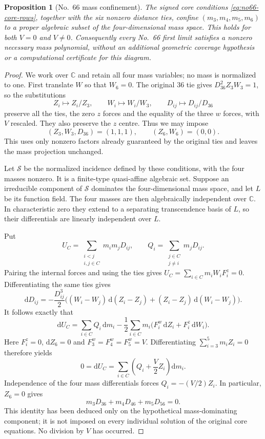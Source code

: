 \documentclass[11pt]{amsart}
\newtheorem{proposition}[theorem]{Proposition}
\theoremstyle{remark}
\newcommand{\C}{\mathbb C}
\begin{document}
\begin{proposition}[No.~66 mass confinement]\label{prop:no66-locus}
The signed core conditions \eqref{eq:no66-core-rows}, together with
the six nonzero distance ties, confine $(m_3,m_4,m_5,m_6)$ to a proper
algebraic subset of the four-dimensional mass space. This holds for
both $V=0$ and $V\ne0$. Consequently every No.~66 first limit satisfies
a nonzero necessary mass polynomial, without an additional geometric
coverage hypothesis or a computational certificate for this diagram.
\end{proposition}
\begin{proof}
We work over $\C$ and retain all four mass variables; no mass is
normalized to one. First translate $W$ so that $W_6=0$.
The original 36 tie gives $D_{36}^2Z_3W_3=1$, so the substitutions
\[
 Z_i\longmapsto Z_i/Z_3,\qquad
 W_i\longmapsto W_i/W_3,\qquad
 D_{ij}\longmapsto D_{ij}/D_{36}
\]
preserve all the ties, the zero $z$ forces and the equality of the
three $w$ forces, with $V$ rescaled. They also preserve the $z$ centre.
Thus we may impose
\begin{equation}\label{eq:no66-normalization}
 (Z_3,W_3,D_{36})=(1,1,1),\qquad (Z_6,W_6)=(0,0).
\end{equation}
This uses only nonzero factors already guaranteed by the original
ties and leaves the mass projection unchanged.

Let $\mathcal S$ be the normalized incidence defined by these
conditions, with the four masses nonzero. It is a finite-type
quasi-affine algebraic set. Suppose an irreducible component of
$\mathcal S$ dominates the four-dimensional mass space, and let $L$
be its function field. The four masses are then algebraically
independent over $\C$. In characteristic zero they extend to a
separating transcendence basis of $L$, so their differentials are
linearly independent over $L$.

Put
\[
 U_C=\sum_{\substack{i<j\\i,j\in C}}m_im_jD_{ij},\qquad
 Q_i=\sum_{\substack{j\in C\\j\ne i}}m_jD_{ij}.
\]
Pairing the internal forces and using the ties gives
$U_C=\sum_{i\in C}m_iW_iF_i^z=0$.
Differentiating the same ties gives
\[
 \mathrm dD_{ij}=-\frac{D_{ij}^3}{2}
 \bigl((W_i-W_j)\,\mathrm d(Z_i-Z_j)
       +(Z_i-Z_j)\,\mathrm d(W_i-W_j)\bigr).
\]
It follows exactly that
\[
 \mathrm dU_C=\sum_{i\in C}Q_i\,\mathrm dm_i
 -\frac12\sum_{i\in C}m_i
 \bigl(F_i^w\,\mathrm dZ_i+F_i^z\,\mathrm dW_i\bigr).
\]
Here $F_i^z=0$, $\mathrm dZ_6=0$ and $F_3^w=F_4^w=F_5^w=V$.
Differentiating $\sum_{i=3}^5m_iZ_i=0$ therefore yields
\[
 0=\mathrm dU_C
   =\sum_{i\in C}\left(Q_i+\frac V2 Z_i\right)\mathrm dm_i.
\]
Independence of the four mass differentials forces
$Q_i=-(V/2)Z_i$. In particular, $Z_6=0$ gives
\begin{equation}\label{eq:no66-dominant-spokes}
 m_3D_{36}+m_4D_{46}+m_5D_{56}=0.
\end{equation}
This identity has been deduced only on the hypothetical
mass-dominating component; it is not imposed on every individual
solution of the original core equations. No division by $V$ has
occurred.


\end{proof}
\end{document}
